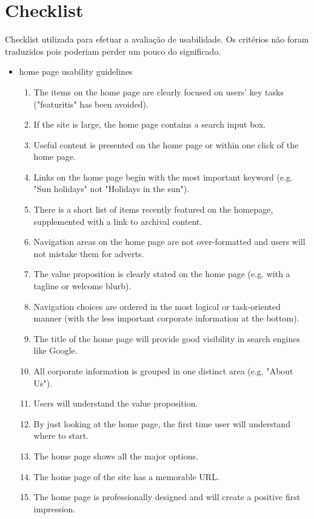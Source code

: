 \section{Checklist}

Checklist utilizada para efetuar a avaliação de usabilidade. Os critérios não foram traduzidos pois poderiam perder um pouco do significado.

\begin{itemize}
  \item home page usability guidelines
      \begin{enumerate}
        \item The items on the home page are clearly focused on users' key tasks ("featuritis" has been avoided).
        \item If the site is large, the home page contains a search input box.
        \item Useful content is presented on the home page or within one click of the home page.
        \item Links on the home page begin with the most important keyword (e.g. "Sun holidays" not "Holidays in the sun").
        \item There is a short list of items recently featured on the homepage, supplemented with a link to archival content.
        \item Navigation areas on the home page are not over-formatted and users will not mistake them for adverts.
        \item The value proposition is clearly stated on the home page (e.g. with a tagline or welcome blurb).
        \item Navigation choices are ordered in the most logical or task-oriented manner (with the less important corporate information at the bottom).
        \item The title of the home page will provide good visibility in search engines like Google.
        \item All corporate information is grouped in one distinct area (e.g. "About Us").
        \item Users will understand the value proposition.
        \item By just looking at the home page, the first time user will understand where to start.
        \item The home page shows all the major options.
        \item The home page of the site has a memorable URL.
        \item The home page is professionally designed and will create a positive first impression.

\end{enumerate}
\end{itemize}
